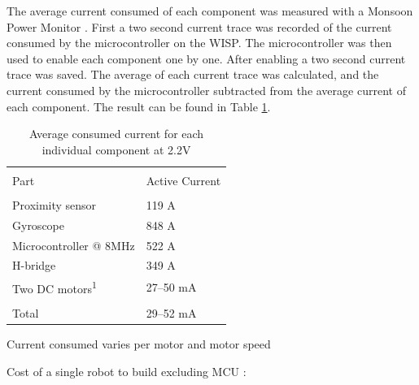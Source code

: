 The average current consumed of each component was measured with a Monsoon Power Monitor \cite{monsoon_powermonitor_2017}.
First a two second current trace was recorded of the current consumed by the microcontroller on the WISP.
The microcontroller was then used to enable each component one by one.
After enabling a two second current trace was saved.
The average of each current trace was calculated, and the current consumed by the microcontroller subtracted from the average current of each component.
The result can be found in Table \ref{tab:avg_cur_comp}.


\begin{table}[t]
	\centering
	\begin{threeparttable}
		\caption{Average consumed current for each individual component at 2.2V}
		\label{tab:avg_cur_comp}
		\begin{tabularx}{0.7\textwidth}{l@{\hskip 0.6in}l} 
			\hline
			\\[-1em]
			Part & Active Current \\
			\hline\hline
			\\[-1em]
			Proximity sensor & 119 \textmu A \\
			Gyroscope & 848 \textmu A\\	
			Microcontroller @ 8MHz & 522 \textmu A\\
			H-bridge & 349 \textmu A \\
			Two DC motors\textsuperscript{1} & 27--50 mA  \\
			\hline
			\\[-1em]
			Total & 29--52 mA \\
			\hline
		\end{tabularx}
		\begin{tablenotes}
		\small
		\item [1] Current consumed varies per motor and motor speed
		\end{tablenotes}
	\end{threeparttable}
\end{table}

Cost of a single robot to build excluding MCU :

